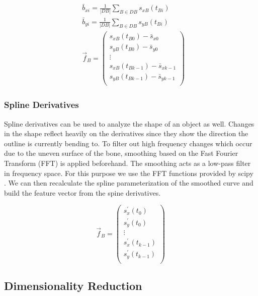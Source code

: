 \documentclass[pdftex,12pt,a4paper]{report}
\begin{document}
\begin{equation}
\begin{split}
& \bar{b}_{xi} = \frac{1}{|DB|} \sum_{B \in DB} s_{xB}(t_{Bi}) \\
& \bar{b}_{yi} = \frac{1}{|DB|} \sum_{B \in DB} s_{yB}(t_{Bi}) \\
& \vec{f}_B = \left( \begin{array}{c}
s_{xB}(t_{B0}) - \bar{s}_{x0} \\
s_{yB}(t_{B0}) - \bar{s}_{y0} \\
\vdots \\
s_{xB}(t_{Bk-1}) - \bar{s}_{xk-1} \\
s_{yB}(t_{Bk-1}) - \bar{s}_{yk-1} \\
\end{array} \right)  
\end{split}
\end{equation}

\subsubsection{Spline Derivatives}

Spline derivatives can be used to analyze the shape of an object as well. Changes in the shape reflect heavily
on the derivatives since they show the direction the outline is currently bending to. To filter out high frequency
changes which occur due to the uneven surface of the bone, smoothing based on the Fast Fourier Transform (FFT) is applied
beforehand. The smoothing acts as a low-pass filter in frequency space. For this purpose we use the FFT functions provided by scipy \cite{oliphant2007python}. We can then recalculate the spline parameterization of the smoothed curve and build the feature vector from the spine derivatives.

\begin{equation}
\vec{f}_B = \left( \begin{array}{c}
s^\prime_{x}(t_{0}) \\
s^\prime_{y}(t_{0}) \\
\vdots \\
s^\prime_{x}(t_{k-1}) \\
s^\prime_{y}(t_{k-1}) \\
\end{array} \right)  
\end{equation}

\subsection{Dimensionality Reduction}
\end{document}

